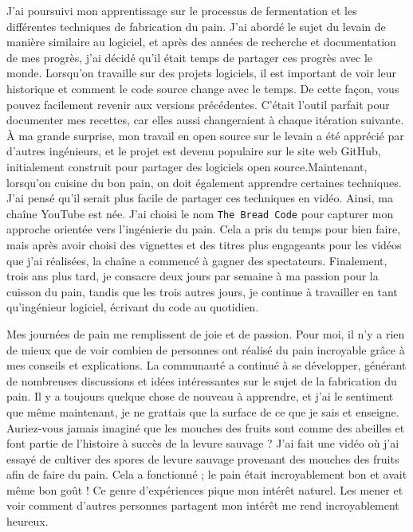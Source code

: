 J'ai poursuivi mon apprentissage sur le processus de fermentation et les différentes techniques de fabrication du pain.
J'ai abordé le sujet du levain de manière similaire au logiciel, et après des années de
recherche et documentation de mes progrès, j'ai décidé qu'il était temps de partager ces progrès avec le
monde.
Lorsqu'on travaille sur des projets logiciels, il est important de voir leur historique et comment le code source
change avec le temps. De cette façon, vous pouvez facilement revenir aux versions précédentes. C'était
l'outil parfait pour documenter mes recettes, car elles aussi changeraient à chaque
itération suivante. À ma grande surprise, mon travail en open source sur le levain a été apprécié
par d'autres ingénieurs, et le projet est devenu populaire sur le site web GitHub, initialement construit pour
partager des logiciels open source.Maintenant, lorsqu'on cuisine du bon pain, on doit également apprendre certaines techniques. J'ai pensé qu'il serait plus facile de partager ces techniques en vidéo. Ainsi, ma chaîne YouTube est née. J'ai choisi le nom \texttt{The Bread Code} pour capturer mon approche orientée vers l'ingénierie du pain. Cela a pris du temps pour bien faire, mais après avoir choisi des vignettes et des titres plus engageants pour les vidéos que j'ai réalisées, la chaîne a commencé à gagner des spectateurs.
Finalement, trois ans plus tard, je consacre deux jours par semaine à ma passion pour la cuisson du pain, tandis que les trois autres jours, je continue à travailler en tant qu'ingénieur logiciel, écrivant du code au quotidien.

Mes journées de pain me remplissent de joie et de passion. Pour moi, il n'y a rien de mieux que de voir combien de personnes ont réalisé du pain incroyable grâce à mes conseils et explications. La communauté a continué à se développer, générant de nombreuses discussions et idées intéressantes sur le sujet de la fabrication du pain. Il y a toujours quelque chose de nouveau à apprendre, et j'ai le sentiment que même maintenant, je ne grattais que la surface de ce que je sais et enseigne. Auriez-vous jamais imaginé que les mouches des fruits sont comme des abeilles et font partie de l'histoire à succès de la levure sauvage ? J'ai fait une vidéo où j'ai essayé de cultiver des spores de levure sauvage provenant des mouches des fruits afin de faire du pain. Cela a fonctionné ; le pain était incroyablement bon et avait même bon goût ! Ce genre d'expériences pique mon intérêt naturel. Les mener et voir comment d'autres personnes partagent mon intérêt me rend incroyablement heureux.


